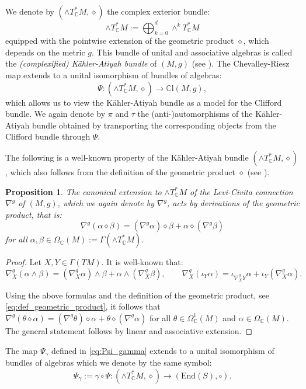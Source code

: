 \documentclass[10pt,a4paper,twoside,reqno]{amsart}
\theoremstyle{plain}
\newtheorem{prop}[thm]{Proposition}
\theoremstyle{definition}
\theoremstyle{remark}
\newcommand{\End}{\mathrm{End}}
\def\C{\mathbb{C}}
\def\mCl{\mathbb{C}\mathrm{l}}
\begin{document}

We denote by $(\wedge T^*_\C M,\diamond)$ the complex exterior bundle: $$\wedge T^*_\C M:=\bigoplus_{k=0}^d\wedge^kT^*_\C M$$ equipped with the pointwise extension of the geometric product $\diamond$, which depends on the metric $g$. This bundle of unital and associative algebras is called the \emph{(complexified) Kähler-Atiyah bundle} of $(M,g)$ (see \cite{LBC13,LBC16}). The Chevalley-Riesz map extends to a unital isomorphism of bundles of algebras: $$\Psi\colon(\wedge T^*_\C M,\diamond)\to\mCl(M,g),$$ which allows us to view the Kähler-Atiyah bundle as a model for the Clifford bundle. We again denote by $\pi$ and $\tau$ the (anti-)automorphisms of the Kähler-Atiyah bundle obtained by transporting the corresponding objects from the Clifford bundle through $\Psi$.\medskip

The following is a well-known property of the Kähler-Atiyah bundle $(\wedge T^*_\C M,\diamond)$, which also follows from the definition of the geometric product $\diamond$ (see \cite{LBC13,LBC16}).

\begin{prop}\label{prop:geometric_product_derivations}
    The canonical extension to $\wedge T^*_\C M$ of the Levi-Civita connection $\nabla^g$ of $(M,g)$, which we again denote by $\nabla^g$, acts by derivations of the geometric product, that is: $$\nabla^g(\alpha\diamond\beta)=(\nabla^g\alpha)\diamond\beta+\alpha\diamond(\nabla^g\beta)$$ for all $\alpha,\beta\in\Omega_\C(M):=\Gamma(\wedge T^*_\C M)$.
\end{prop}

\begin{proof}
    Let $X,Y\in\Gamma(TM)$. It is well-known that: $$\nabla^g_X(\alpha\wedge\beta)=(\nabla^g_X\alpha)\wedge\beta+\alpha\wedge(\nabla^g_X\beta),\qquad \nabla^g_X(\iota_Y\alpha)=\iota_{\nabla^g_XY}\alpha+\iota_Y(\nabla^g_X\alpha).$$

    Using the above formulas and the definition of the geometric product, see \eqref{eq:def_geometric_product}, it follows that $\nabla^g(\theta\diamond\alpha)=(\nabla^g\theta)\diamond\alpha+\theta\diamond(\nabla^g\alpha)$ for all $\theta\in\Omega^1_\C(M)$ and $\alpha\in\Omega_\C(M)$. The general statement follows by linear and associative extension.
\end{proof}

The map $\Psi_\gamma$ defined in \eqref{eq:Psi_gamma} extends to a unital isomorphism of bundles of algebras which we denote by the same symbol: $$\Psi_\gamma:=\gamma\circ\Psi\colon(\wedge T^*_\C M,\diamond)\to(\End(S),\circ).$$
\end{document}

